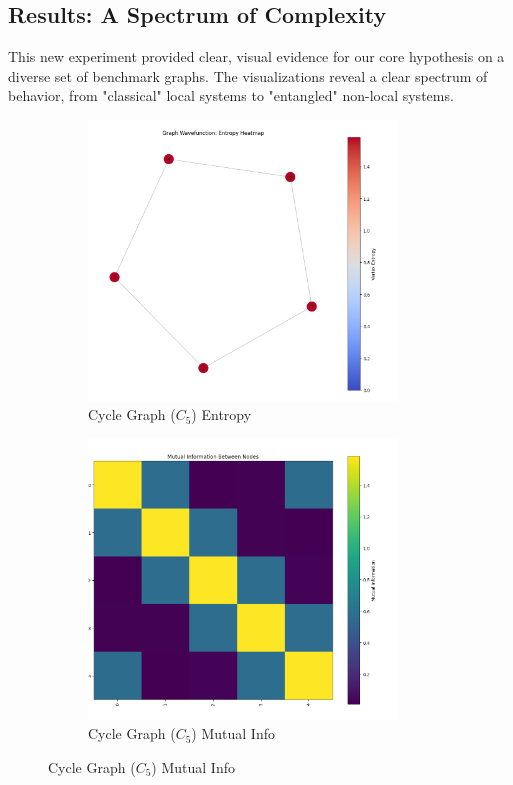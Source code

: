 \documentclass[12pt, letterpaper]{article}
\begin{document}
\subsection{Results: A Spectrum of Complexity}
This new experiment provided clear, visual evidence for our core hypothesis on a diverse set of benchmark graphs. The visualizations reveal a clear spectrum of behavior, from "classical" local systems to "entangled" non-local systems.

\begin{figure}[h!]
    \centering
    \begin{subfigure}[b]{0.48\textwidth}
        \includegraphics[width=0.9\textwidth]{images/Cycle_Graph_Entropy_Map.png}
        \caption{Cycle Graph ($C_5$) Entropy}
        \label{fig:cycle_entropy}
    \end{subfigure}
    \hfill
    \begin{subfigure}[b]{0.48\textwidth}
        \includegraphics[width=0.9\textwidth]{images/Cycle_Graph_Mutal_Info_Matrix.png}
        \caption{Cycle Graph ($C_5$) Mutual Info}
        \label{fig:cycle_mi}
    \end{subfigure}
    

\end{figure}
\end{document}
